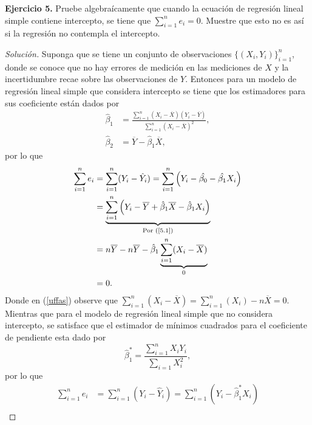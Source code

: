 \documentclass[10.5pt,notitlepage]{article}
\newenvironment{solucion}
  {\begin{proof}[Solución]}
  {\end{proof}}
\newcommand{\pare}[1]{\left( #1 \right)}
\begin{document}
\noindent \textbf{Ejercicio 5.} Pruebe algebraícamente que cuando la ecuación de regresión lineal simple contiene intercepto, se tiene que \(\sum_{i=1}^{n}e_i = 0\). Muestre que esto no es así si la regresión no contempla el intercepto.
\begin{solucion}
Suponga que se tiene un conjunto de observaciones \(\{(X_i,Y_i)\}_{i=1}^{n}\), donde se conoce que no hay errores de medición en las mediciones de \(X\) y la incertidumbre recae sobre las observaciones de \(Y\). Entonces para un modelo de regresión lineal simple que considera intercepto se tiene que los estimadores para sus coeficiente están dados por 
\begin{align}\label{5.1}
    \hat{\beta}_1 &= \frac{\sum_{i = 1}^{n}(X_i - \overline{X})(Y_i - \overline{Y})}{\sum_{i=1}^{n}(X_i - \overline{X})^2},\nonumber\\ 
    \hat{\beta}_2 &= \overline{Y} - \hat{\beta}_1 \overline{X}, 
\end{align}
por lo que
\begin{align}
    \sum_{i = 1}^{n}e_i &= \sum_{i = 1}^{n}(Y_i - \hat{Y}_i) = \sum_{i = 1}^{n}\pare{Y_i - \hat{\beta_0} - \hat{\beta_1}X_i}\nonumber\\ 
                        &= \underbrace{ \sum_{i = 1}^{n}\pare{ Y_i - \overline{Y} + \hat{\beta}_1 \overline{X} - \hat{\beta}_1 X_i} }_{\text{Por (\ref{5.1})}}\nonumber\\ 
                        &= n \overline{Y} -  n \overline{Y} - \hat{\beta}_1\underbrace{\sum_{i = 1}^{n}(X_i - \overline{X})}_{0}\label{uffas}\\
                        &= 0.\label{5.1upss}
\end{align}
Donde en (\ref{uffas}) observe que \(\sum_{i=1}^{n}(X_i - \overline{X}) = \sum_{i=1}^{n}(X_i) - n\overline{X} = 0\). Mientras que para el modelo de regresión lineal simple que no considera intercepto, se satisface que el estimador de mínimos cuadrados para el coeficiente de pendiente esta dado por 
\begin{equation}
    \hat{\beta}_{1}^{*} = \frac{\sum_{i=1}^{n}X_iY_i}{\sum_{i=1}X_{i}^2}, \label{5.2}
\end{equation}
por lo que 
\begin{align}
    \sum_{i = 1}^{n}e_i &= \sum_{i = 1}^{n}(Y_i - \hat{Y}_i) = \sum_{i = 1}^{n}\pare{ Y_i - \hat{\beta}_{1}^* X_i}\nonumber\\ 

\end{align}
\end{solucion}
\end{document}
